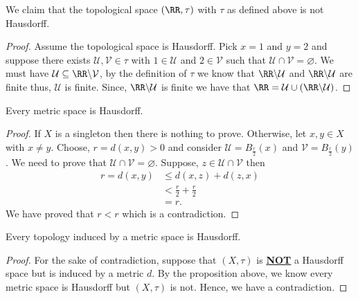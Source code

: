 \documentclass[12pt, a4paper]{article}
\begin{document}
\begin{example}
    We claim that the topological space \((\RR,\tau)\) with \(\tau\) as defined above is not Hausdorff.
    \begin{proof}
        Assume the topological space is Hausdorff. Pick \(x=1\) and \(y=2\) and suppose there exists \(\mathcal{U},\mathcal{V} \in \tau\) with \(1 \in \mathcal{U}\) and \(2 \in \mathcal{V}\) such that \(\mathcal{U} \cap \mathcal{V} = \varnothing\). We must have \(\mathcal{U} \subseteq \RR \backslash \mathcal{V}\), by the definition of \(\tau\) we know that \(\RR \backslash \mathcal{U}\) and \(\RR \backslash \mathcal{U}\) are finite thus, \(\mathcal{U}\) is finite. Since, \(\RR \backslash \mathcal{U}\) is finite we have that \(\RR = \mathcal{U} \cup \left( \RR \backslash \mathcal{U} \right)\).
    \end{proof}
\end{example}

\begin{mdprop}
    Every metric space is Hausdorff.
\end{mdprop}

\begin{proof}
    If \(X\) is a singleton then there is nothing to prove. Otherwise, let \(x,y \in X\) with \(x \neq y\). Choose, \(r= d(x,y)>0\) and consider \(\mathcal{U} = B_{\frac{r}{2}}(x)\) and \(\mathcal{V} = B_{\frac{r}{2}}(y)\). We need to prove that \(\mathcal{U} \cap \mathcal{V} = \varnothing\). Suppose, \(z \in \mathcal{U} \cap \mathcal{V}\) then 
    \[\begin{aligned}
        r = d(x,y) &\leq d(x,z) + d(z,x) \\
        &< \frac{r}{2} +\frac{r}{2} \\
        &= r.
    \end{aligned}\]
    We have proved that \(r<r\) which is a contradiction.
\end{proof}

\begin{mdcor}
    Every topology induced by a metric space is Hausdorff.
\end{mdcor}

\begin{proof}
    For the sake of contradiction, suppose that \((X,\tau)\) is \textbf{\ul{NOT}} a Hausdorff space but is induced by a metric \(d\). By the proposition above, we know every metric space is Hausdorff but \((X,\tau)\) is not. Hence, we have a contradiction.
\end{proof}
\end{document}
